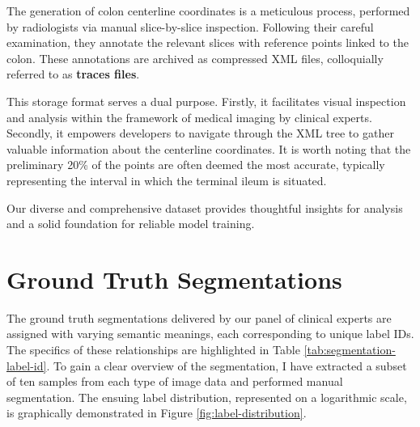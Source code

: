     The generation of colon centerline coordinates is a meticulous process, performed by radiologists via manual slice-by-slice inspection. Following their careful examination, they annotate the relevant slices with reference points linked to the colon. These annotations are archived as compressed XML files, colloquially referred to as \textbf{traces files}.

    This storage format serves a dual purpose. Firstly, it facilitates visual inspection and analysis within the framework of medical imaging by clinical experts. Secondly, it empowers developers to navigate through the XML tree to gather valuable information about the centerline coordinates. It is worth noting that the preliminary 20\% of the points are often deemed the most accurate, typically representing the interval in which the terminal ileum is situated.

Our diverse and comprehensive dataset provides thoughtful insights for analysis and a solid foundation for reliable model training.

\section{Ground Truth Segmentations}

The ground truth segmentations delivered by our panel of clinical experts are assigned with varying semantic meanings, each corresponding to unique label IDs. The specifics of these relationships are highlighted in Table \ref{tab:segmentation-label-id}. To gain a clear overview of the segmentation, I have extracted a subset of ten samples from each type of image data and performed manual segmentation. The ensuing label distribution, represented on a logarithmic scale, is graphically demonstrated in Figure \autoref{fig:label-distribution}.

